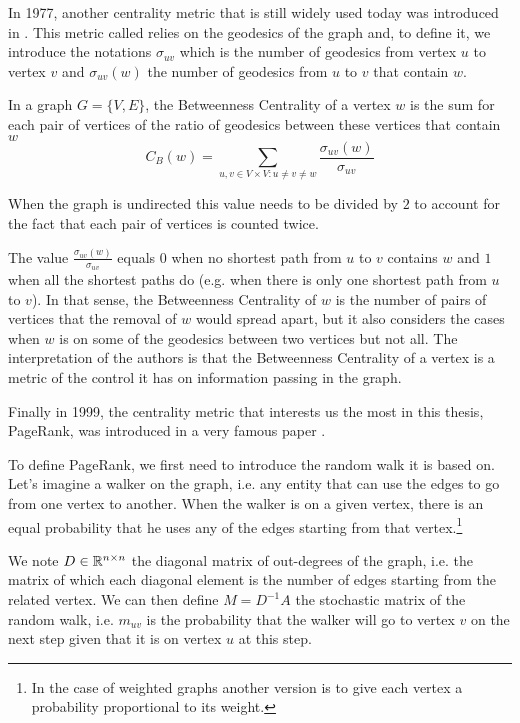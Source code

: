 In 1977, another centrality metric that is still widely used today was introduced in \cite{freeman1977_BetweennessCentrality}. This metric called  relies on the geodesics of the graph and, to define it, we introduce the notations $\sigma_{uv}$ which is the number of geodesics from vertex $u$ to vertex $v$ and $\sigma_{uv}(w)$ the number of geodesics from $u$ to $v$ that contain $w$.

\begin{definition}
    In a graph $G = \{V, E\}$, the Betweenness Centrality of a vertex $w$ is the sum for each pair of vertices of the ratio of geodesics between these vertices that contain $w$
    \begin{equation}
        C_B(w) = \sum_{u,v \in V\times V : u\neq v \neq w} \frac{\sigma_{uv}(w)}{\sigma_{uv}}
    \end{equation}
\end{definition}

When the graph is undirected this value needs to be divided by $2$ to account for the fact that each pair of vertices is counted twice.

The value $\frac{\sigma_{uv}(w)}{\sigma_{uv}}$ equals $0$ when no shortest path from $u$ to $v$ contains $w$ and $1$ when all the shortest paths do (e.g. when there is only one shortest path from $u$ to $v$). In that sense, the Betweenness Centrality of $w$ is the number of pairs of vertices that the removal of $w$ would spread apart, but it also considers the cases when $w$ is on some of the geodesics between two vertices but not all. The interpretation of the authors is that the Betweenness Centrality of a vertex is a metric of the control it has on information passing in the graph.

Finally in 1999, the centrality metric that interests us the most in this thesis, PageRank, was introduced in a very famous paper \cite{pagerank}.

To define PageRank, we first need to introduce the random walk it is based on. Let's imagine a walker on the graph, i.e. any entity that can use the edges to go from one vertex to another. When the walker is on a given vertex, there is an equal probability that he uses any of the edges starting from that vertex.\footnote{In the case of weighted graphs another version is to give each vertex a probability proportional to its weight.}

We note $D \in \mathbb{R}^{n\times n}$ the diagonal matrix of out-degrees of the graph, i.e. the matrix of which each diagonal element is the number of edges starting from the related vertex. We can then define $M = D^{-1} A$ the stochastic matrix of the random walk, i.e. $m_{uv}$ is the probability that the walker will go to vertex $v$ on the next step given that it is on vertex $u$ at this step.

